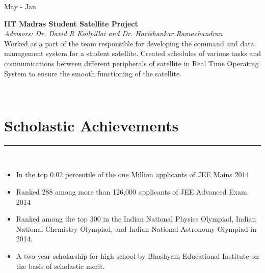 \documentclass[10pt]{article}
\newcommand\vtick{\textquotesingle}
\begin{document}
\noindent
\begin{minipage}[t]{.2\textwidth}
May\vtick16 - Jan\vtick17
\end{minipage}
\begin{minipage}[t]{0.8\textwidth}
{\bf IIT Madras Student Satellite Project} \\
{\it Advisors: Dr. David R Koilpillai and Dr. Harishankar Ramachandran}\\
Worked as a part of the team responsible for developing the command and data management system for a student satellite. Created schedules of various tasks and communications between different peripherals of satellite in Real Time Operating System to ensure the smooth functioning of the satellite.
\end{minipage} \\

\section*{\color{black} Scholastic Achievements}
\noindent\textcolor{black}{\rule{\textwidth}{1.5pt}} \vspace{-1cm}\\
\begin{itemize}
    \setlength\itemsep{-.1em}
    \item In the top 0.02 percentile of the one Million applicants of JEE Mains 2014
    \item Ranked 288 among more than 126,000 applicants of JEE Advanced Exam 2014
    \item Ranked among the top 300 in the Indian National Physics Olympiad, Indian National Chemistry Olympiad, and Indian National Astronomy Olympiad in 2014.
    \item A two-year scholarship for high school by Bhashyam Educational Institute on the basis of scholastic merit.
\end{itemize}

\end{document}
